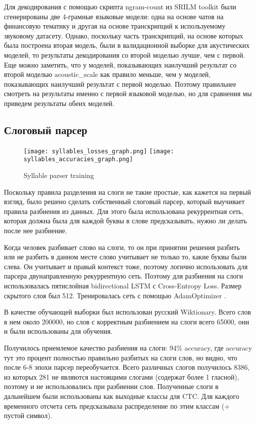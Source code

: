 \documentclass[a4paper,14pt]{extarticle}
\begin{document}
Для декодирования с помощью  скрипта ngram-count из SRILM toolkit были сгенерированы две 4-грамные языковые модели: одна на основе чатов на финансовую тематику и другая на основе транскрипций к используемому звуковому датасету. Однако, поскольку часть транскрипций, на основе которых была построена вторая модель, были в валидационной выборке для акустических моделей, то результаты декодирования со второй моделью лучше, чем с первой. Еще можно заметить, что у моделей, показывающих наилучший результат со второй моделью acoustic\_scale как правило меньше, чем у моделей, показывающих наилучший результат с первой моделью. Поэтому правильнее смотреть на результаты именно с первой языковой моделью, но для сравнения мы приведем результаты обеих моделей.
\subsection{Слоговый парсер}
\begin{figure}[!h]
	\texttt{[image: syllables\_losses\_graph.png]}%
	\texttt{[image: syllables\_accuracies\_graph.png]}
	\caption{Syllable parser training}
	\label{syllable_parser_train}
\end{figure}
Поскольку правила разделения на слоги не такие простые, как кажется на первый взгляд, было решено сделать собственный слоговый парсер, который выучивает правила разбиения из данных. Для этого была использована рекуррентная сеть, которая должна была для каждой буквы в слове предсказывать, нужно ли делать после нее разбиение.

Когда человек разбивает слово на слоги, то он при принятии решения разбить или не разбить в данном месте слово учитывает не только то, какие буквы были слева. Он учитывает и правый контекст тоже, поэтому логично использовать для парсера двунаправленную рекуррентную сеть. Поэтому  для разбиения на слоги использовалась пятислойная bidirectional LSTM с Cross-Entropy Loss. Размер скрытого слоя был 512.
Тренировалась сеть с помощью AdamOptimizer \cite{adam}.

В качестве обучающей выборки был использован русский Wiktionary. Всего слов в нем около 200000, но слов с корректным разбиением на слоги всего 65000, они и были использованы для обучения.

Получилось приемлемое качество разбиения на слоги: 94\% accuracy, где accuracy тут это процент полностью правильно разбитых на слоги слов, но видно, что после 6-8 эпохи парсер переобучается. Всего различных слогов получилось 8386, из которых 281 не являются настоящими слогами (содержат более 1 гласной), поэтому и не использовались при разбиении слов. Полученные слоги в дальнейшем были использованы как выходные классы для CTC. Для каждого временного отсчета сеть предсказывала распределение по этим классам (+ пустой символ).
\end{document}
